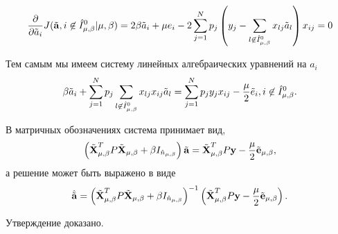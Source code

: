 \begin{Proof}
\begin{equation}
	\frac{\partial}{\partial\tilde a_i}J(\tilde{\boldsymbol{\mathbf{a}}}, i\not\in \hat I^0_{\mu,\beta} | {\mu,\beta})
		= 2\beta \tilde a_i + \mu e_i - 2\sum\limits_{j=1}^N p_j\left(y_j - \sum\limits_{l\not\in \hat I^0_{\mu,\beta}}x_{lj}\tilde a_l\right)x_{ij} = 0
\end{equation}

Тем самым мы имеем систему линейных алгебраических уравнений на $a_i$
\begin{equation*}
	\beta \tilde a_i + \sum\limits_{j=1}^N p_j\sum\limits_{l\not\in \hat I^0_{\mu,\beta}} x_{lj}x_{ij}\tilde a_l
		= \sum\limits_{j=1}^N p_jy_jx_{ij} -\frac\mu2 \tilde e_i, i\not\in \hat I^0_{\mu,\beta}.
\end{equation*}

В матричных обозначениях система принимает вид,
\begin{equation*}
	\left(\tilde{\boldsymbol{\mathbf{X}}}^T_{\mu,\beta} P\tilde{\boldsymbol{\mathbf{X}}}_{\mu,\beta} + \beta I_{\hat n_{\mu,\beta}}\right) \tilde{\boldsymbol{\mathbf{a}}}
		= \tilde{\boldsymbol{\mathbf{X}}}^T_{\mu,\beta} P \boldsymbol{\mathbf{y}} -\frac\mu2\tilde{\boldsymbol{\mathbf{e}}}_{\mu,\beta},
\end{equation*}
а решение может быть выражено в виде
\begin{equation}
	\hat{\tilde{\mathbf a}}
		= \left(\tilde{\boldsymbol{\mathbf{X}}}^T_{\mu,\beta} P\tilde{\boldsymbol{\mathbf{X}}}_{\mu,\beta} + \beta I_{\hat n_{\mu,\beta}}\right)^{-1}\left(\tilde{\boldsymbol{\mathbf{X}}}^T_{\mu,\beta} P \boldsymbol{\mathbf{y}} -\frac\mu2\tilde{\boldsymbol{\mathbf{e}}}_{\mu,\beta}\right).
\end{equation}

Утверждение доказано.
\end{Proof}

